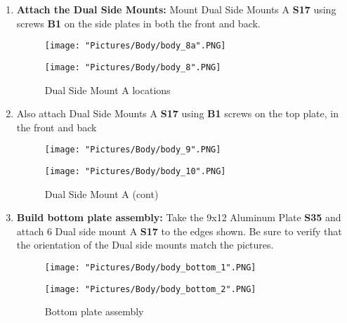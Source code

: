 \documentclass[12pt]{article}
\begin{document}
\begin{enumerate}

\item \textbf{Attach the Dual Side Mounts:} Mount Dual Side Mounts A \textbf{S17} using screws \textbf{B1} on the side plates in both the front and back. 

\begin{figure}[H]
  \centering
  \begin{minipage}[b]{0.40\textwidth}
    \texttt{[image: "Pictures/Body/body\_8a".PNG]}
  \end{minipage}
  \hfill
  \begin{minipage}[b]{0.40\textwidth}
    \texttt{[image: "Pictures/Body/body\_8".PNG]}
  \end{minipage}
  \caption{Dual Side Mount A locations}
  \label{Dual Side Mounts}
\end{figure}

\item Also attach Dual Side Mounts A \textbf{S17} using \textbf{B1} screws on the top plate, in the front and back

\begin{figure}[H]
  \centering
  \begin{minipage}[b]{0.40\textwidth}
    \texttt{[image: "Pictures/Body/body\_9".PNG]}
  \end{minipage}
  \hfill
  \begin{minipage}[b]{0.40\textwidth}
    \texttt{[image: "Pictures/Body/body\_10".PNG]}
  \end{minipage}
  \caption{Dual Side Mount A (cont)}
  \label{Dual Side Mounts_cont}
\end{figure}

\item \textbf{Build bottom plate assembly:} Take the 9x12 Aluminum Plate \textbf{S35} and attach 6 Dual side mount A \textbf{S17} to the edges shown. Be sure to verify that the orientation of the Dual side mounts match the pictures.

\begin{figure}[H]
  \centering
  \begin{minipage}[b]{0.40\textwidth}
    \texttt{[image: "Pictures/Body/body\_bottom\_1".PNG]}
  \end{minipage}
  \hfill
  \begin{minipage}[b]{0.40\textwidth}
    \texttt{[image: "Pictures/Body/body\_bottom\_2".PNG]}
  \end{minipage}
  \caption{Bottom plate assembly}
  \label{bottom}
\end{figure}


\end{enumerate}
\end{document}
